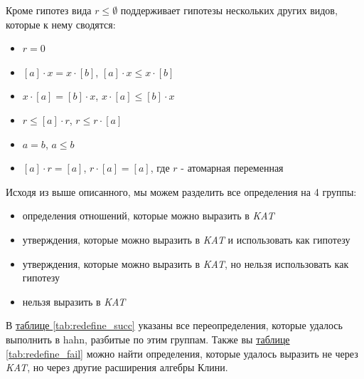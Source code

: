 \documentclass[times
              ]{itmo-student-thesis}
\begin{document}
      Кроме гипотез вида $r \leq \emptyset$ \; поддерживает гипотезы нескольких других видов, которые к нему
      сводятся:
      \begin{itemize}
        \item $ r = 0 $
        \item $[a] \cdot x = x \cdot [b]$, $[a] \cdot x \leq x \cdot [b]$
        \item $x \cdot [a] = [b] \cdot x$, $x \cdot [a] \leq [b] \cdot x$
        \item $ r \leq [a] \cdot r $, $ r \leq r \cdot [a]$
        \item $ a = b $, $ a \leq b $
        \item $[a] \cdot r = [a]$, $r \cdot [a] = [a]$, где $r$ - атомарная переменная
      \end{itemize}

      Исходя из выше описанного, мы можем разделить все определения на 4 группы:
      \begin{itemize}
        \item определения отношений, которые можно выразить в \textit{KAT}
        \item утверждения, которые можно выразить в \textit{KAT} и использовать как гипотезу
        \item утверждения, которые можно выразить в \textit{KAT}, но нельзя использовать как гипотезу
        \item нельзя выразить в \textit{KAT}
      \end{itemize}

      В \hyperref[tab:redefine_succ]{таблице \ref{tab:redefine_succ}} указаны все переопределения,
      которые удалось выполнить в hahn, разбитые по этим группам.
      Также вы \hyperref[tab:redefine_fail]{таблице \ref{tab:redefine_fail}} можно найти определения, которые
      удалось выразить не через \textit{KAT}, но через другие расширения алгебры Клини.
\end{document}
